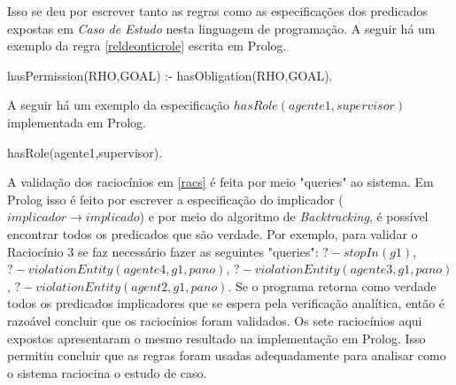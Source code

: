 Isso se deu por escrever tanto as regras como as especificações dos predicados expostas em \textit{Caso de Estudo} nesta linguagem de programação. A seguir há um exemplo da regra \ref{reldeonticrole} escrita em Prolog.

hasPermission(RHO,GOAL) :- hasObligation(RHO,GOAL).

A seguir há um exemplo da especificação $hasRole(agente1,supervisor)$ implementada em Prolog.

hasRole(agente1,supervisor).

A validação dos raciocínios em \ref{racs} é feita por meio "queries" ao sistema. Em Prolog isso é feito por escrever a especificação do implicador ($implicador \to implicado$) e por meio do algoritmo de \textit{Backtracking}, é possível encontrar todos os predicados que são verdade. Por exemplo, para validar o Raciocínio 3 se faz necessário fazer as seguintes "queries": $? - stopIn(g1)$, $? - violationEntity(agente4,g1,pano)$, $? - violationEntity(agente3,g1,pano)$, $? - violationEntity(agent2,g1,pano)$. Se o programa retorna como verdade todos os predicados implicadores que se espera pela verificação analítica, então é razoável concluir que os raciocínios foram validados. Os sete raciocínios aqui expostos apresentaram o mesmo resultado na implementação em Prolog. Isso permitiu concluir que as regras foram usadas adequadamente para analisar como o sistema raciocina o estudo de caso. 